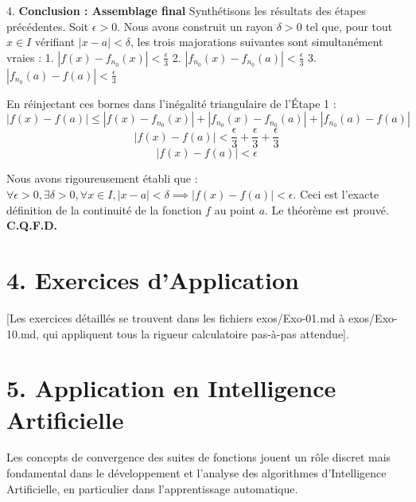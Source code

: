 \documentclass{report}
\begin{document}
4. \textbf{Conclusion : Assemblage final}
   Synthétisons les résultats des étapes précédentes.
   Soit $\epsilon > 0$. Nous avons construit un rayon $\delta > 0$ tel que, pour tout $x \in I$ vérifiant $|x - a| < \delta$, les trois majorations suivantes sont simultanément vraies :
   1. $|f(x) - f_{n_0}(x)| < \frac{\epsilon}{3}$
   2. $|f_{n_0}(x) - f_{n_0}(a)| < \frac{\epsilon}{3}$
   3. $|f_{n_0}(a) - f(a)| < \frac{\epsilon}{3}$

   En réinjectant ces bornes dans l'inégalité triangulaire de l'Étape 1 :
   $$ |f(x) - f(a)| \le |f(x) - f_{n_0}(x)| + |f_{n_0}(x) - f_{n_0}(a)| + |f_{n_0}(a) - f(a)| $$
   $$ |f(x) - f(a)| < \frac{\epsilon}{3} + \frac{\epsilon}{3} + \frac{\epsilon}{3} $$
   $$ |f(x) - f(a)| < \epsilon $$

   Nous avons rigoureusement établi que : $\forall \epsilon > 0, \exists \delta > 0, \forall x \in I, |x - a| < \delta \implies |f(x) - f(a)| < \epsilon$.
   Ceci est l'exacte définition de la continuité de la fonction $f$ au point $a$. Le théorème est prouvé.
   \textbf{C.Q.F.D.}

\section*{4. Exercices d'Application}

[Les exercices détaillés se trouvent dans les fichiers exos/Exo-01.md à exos/Exo-10.md, qui appliquent tous la rigueur calculatoire pas-à-pas attendue].

\section*{5. Application en Intelligence Artificielle}

Les concepts de convergence des suites de fonctions jouent un rôle discret mais fondamental dans le développement et l'analyse des algorithmes d'Intelligence Artificielle, en particulier dans l'apprentissage automatique.
\end{document}
